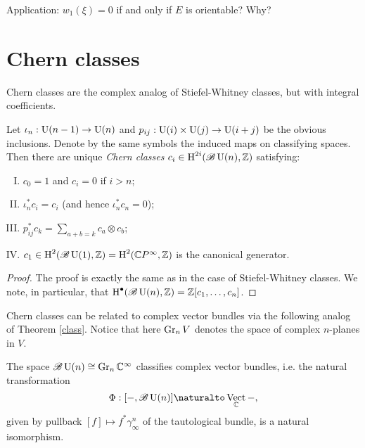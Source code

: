 \documentclass{amsart}
\DeclareMathOperator{\Vect}{Vect}
\begin{document}
{\color{magenta} Application: $w_1(\xi)=0$ if and only if $E$ is orientable? Why?}

\section{Chern classes}

Chern classes are the complex analog of Stiefel-Whitney classes, but with integral coefficients.
\begin{theorem}
    Let $\iota_n:\operatorname{U}(n-1)\to\operatorname{U}(n)$ and $p_{ij}:\operatorname{U}(i)\times \operatorname{U}(j)\to \operatorname{U}(i+j)$ be the obvious
    inclusions. Denote by the same symbols the induced maps on classifying spaces.
    Then there are unique \textit{Chern classes} $c_i\in \operatorname{H}^{2i}(\mathscr{B}\operatorname{U}(n), \mathbb{Z})$ satisfying:
    \begin{enumerate}[(I)]
        \item $c_0=1$ and $c_i=0$ if $i>n$;
        \item $\iota_n^*c_i=c_i$ (and hence $\iota_n^*c_n=0$);
        \item $p_{ij}^*c_k=\sum_{a+b=k}c_a\otimes c_b$;
        \item $c_1\in\operatorname{H}^2(\mathscr{B}\operatorname{U}(1),\mathbb{Z})=\operatorname{H}^2(\mathbb{C} P^\infty,\mathbb{Z})$ is the canonical generator.
    \end{enumerate}
    \label{chern}
\end{theorem}
\begin{proof}
    The proof is exactly the same as in the case of Stiefel-Whitney classes.
    We note, in particular, that $\operatorname{H}^\bullet(\mathscr{B}\operatorname{U}(n),\mathbb{Z})=\mathbb{Z}[c_1,\ldots,c_n]$.
\end{proof}

Chern classes can be related to complex vector bundles via the following analog of Theorem
\ref{class}. Notice that here $\operatorname{Gr}_n V$ denotes the space of complex $n$-planes in $V$.
\begin{theorem}
    The space $\mathscr{B}\operatorname{U}(n)\cong\operatorname{Gr}_n\mathbb{C}^\infty$ classifies complex vector bundles, i.e. the natural
    transformation
    \begin{equation*}
        \Phi: [-,\mathscr{B}\UU(n)] \naturalto \Vect_\C-,
    \end{equation*}
    given by pullback $[f]\mapsto f^*\gamma^n_\infty$ of the tautological bundle, is a natural isomorphism.
\end{theorem}
\end{document}

